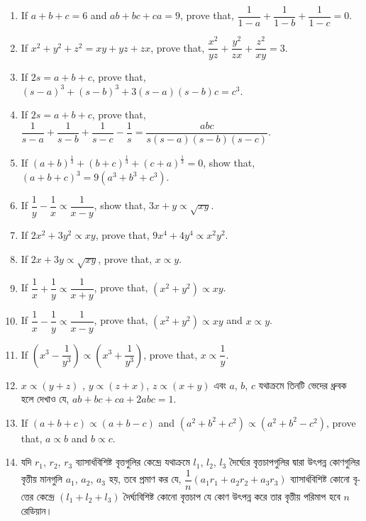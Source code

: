 \documentclass[11pt, a4paper]{article}
\begin{document}
\begin{enumerate}
	\item If $a+b+c = 6$ and $ab+bc+ca = 9$, prove that, $\dfrac{1}{1-a} + \dfrac{1}{1-b} + \dfrac{1}{1-c} = 0$.
	
	\item If $x^2 + y^2 + z^2 = xy + yz + zx$, prove that, $\dfrac{x^2}{yz} + \dfrac{y^2}{zx} + \dfrac{z^2}{xy} = 3$.
	
	\item If $2s = a+b+c$, prove that, $(s-a)^3 + (s-b)^3 + 3(s-a)(s-b)c = c^3$.
	
	\item If $2s = a+b+c$, prove that, $\dfrac{1}{s-a} + \dfrac{1}{s-b} + \dfrac{1}{s-c} - \dfrac{1}{s} = \dfrac{abc}{s(s-a)(s-b)(s-c)}$.
	
	\item If $(a+b)^\frac{1}{3} + (b+c)^\frac{1}{3} + (c+a)^\frac{1}{3} = 0$, show that, $(a+b+c)^3 = 9(a^3 + b^3 + c^3)$.
	
	\item If $\dfrac{1}{y} - \dfrac{1}{x} \propto \dfrac{1}{x-y}$, show that, $3x + y \propto \sqrt{xy}$.
	
	\item If $2x^2 + 3y^2 \propto xy$, prove that, $9x^4 + 4y^4 \propto x^2y^2$.
	
	\item If $2x + 3y \propto \sqrt{xy}$, prove that, $x \propto y$.
	
	\item If $\dfrac{1}{x} + \dfrac{1}{y} \propto \dfrac{1}{x+y}$, prove that, $(x^2 + y^2) \propto xy$.
	
	\item If $\dfrac{1}{x} - \dfrac{1}{y} \propto \dfrac{1}{x-y}$, prove that, $(x^2 + y^2) \propto xy$ and $x \propto y$.
	
	\item If $\left( x^3 - \dfrac{1}{y^3} \right) \propto \left( x^3 + \dfrac{1}{y^3} \right)$, prove that, $x \propto \dfrac{1}{y}$.
	
	\item $x \propto (y+z)$	, $y \propto (z+x)$, $z \propto (x+y)$ \textbengali{এবং} $a$, $b$, $c$ \textbengali{যথাক্রমে তিনটি ভেদের ধ্রুবক হলে দেখাও যে,} $ab+bc+ca+2abc = 1$.
	
	\item If $(a+b+c) \propto (a+b-c)$ and $(a^2 + b^2 + c^2) \propto (a^2 + b^2 - c^2)$, prove that, $a \propto b$ and $b \propto c$.
	
	\item \textbengali{যদি} $r_1$, $r_2$, $r_3$ \textbengali{ব্যাসার্ধবিশিষ্ট বৃত্তগুলির কেন্দ্রে যথাক্রমে} $l_1$, $l_2$, $l_3$ \textbengali{দৈর্ঘ্যের বৃত্তচাপগুলির দ্বারা উৎপন্ন কোণগুলির বৃত্তীয় মানগুলি} $a_1$, $a_2$, $a_3$ \textbengali{হয়, তবে প্রমাণ কর যে,} $\dfrac{1}{n} \left( a_1 r_1 + a_2 r_2 + a_3 r_3 \right)$ \textbengali{ব্যাসার্ধবিশিষ্ট কোনো বৃত্তের কেন্দ্রে} $\left( l_1 + l_2 + l_3 \right)$ \textbengali{দৈর্ঘ্যবিশিষ্ট কোনো বৃত্তচাপ যে কোণ উৎপন্ন করে তার বৃত্তীয় পরিমাপ হবে} $n$ \textbengali{রেডিয়ান।} 
	

\end{enumerate}
\end{document}
